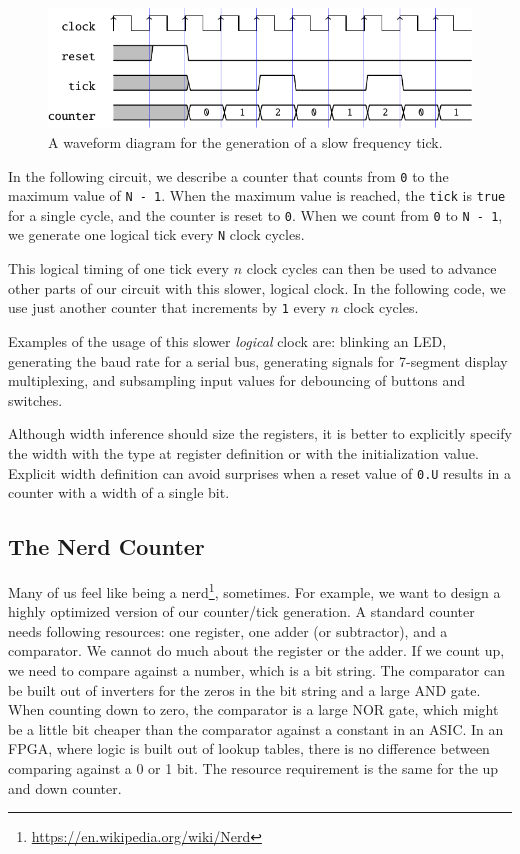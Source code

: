 \documentclass[%
    10pt,
    headinclude, footexclude,
    openright, %
    notitlepage,
    cleardoubleempty,
    headsepline,
    pointlessnumbers,
    bibtotoc, idxtotoc,
    ]{scrbook}
\newcommand{\code}[1]{{\small{\texttt{#1}}}}
\newcommand{\myref}[2]{\href{#1}{#2}}
\renewcommand{\myref}[2]{{#2}{\footnote{\url{#1}}}}
\begin{document}
\begin{figure}
  \centering
  \includegraphics[scale=1]{figures/tick_wave}
  \caption{A waveform diagram for the generation of a slow frequency tick.}
  \label{fig:tick-wave}
\end{figure}


In the following circuit, we describe a counter that counts from \code{0}
to the maximum value of \code{N - 1}. When the maximum value is reached,
the \code{tick} is \code{true} for a single cycle, and the counter is reset to \code{0}.
When we count from \code{0} to \code{N - 1}, we generate one logical tick
every \code{N} clock cycles.


\noindent This logical timing of one tick every $n$ clock cycles can then be used
to advance other parts of our circuit with this slower, logical clock.
In the following code, we use just another counter that increments by \code{1}
every $n$ clock cycles.


Examples of the usage of this slower \emph{logical} clock are: blinking an LED,
generating the baud rate for a serial bus, generating signals for 7-segment
display multiplexing, and subsampling input values for debouncing of buttons
and switches. 

Although width inference should size the registers, it is better to explicitly
specify the width with the type at register definition or with the
initialization value. Explicit width definition can avoid surprises when a reset value of \code{0.U}
results in a counter with a width of a single bit.

\subsection{The Nerd Counter}

Many of us feel like being a \myref{https://en.wikipedia.org/wiki/Nerd}{nerd}, sometimes.
For example, we want to design a highly optimized version of our counter/tick generation.
A standard counter needs following resources: one register, one adder (or subtractor),
and a comparator. We cannot do much about the register or the adder. If we count
up, we need to compare against a number, which is a bit string. The comparator
can be built out of inverters for the zeros in the bit string and a large AND gate.
When counting down to zero, the comparator is a large NOR gate, which might be
a little bit cheaper than the comparator against a constant in an ASIC.
In an FPGA, where logic is built out of lookup tables, there is no difference between comparing
against a 0 or 1 bit. The resource requirement is the same for the up and down counter.
\end{document}
